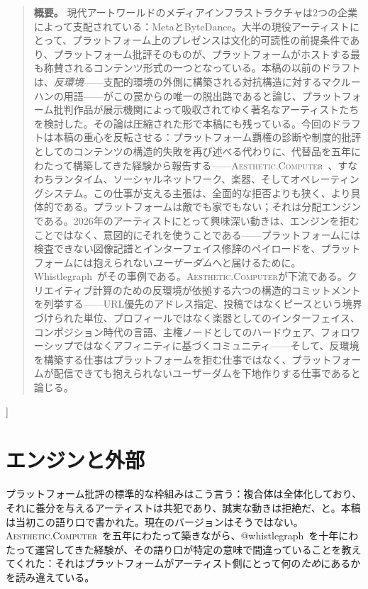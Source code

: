 \documentclass[10pt,letterpaper,twocolumn]{article}
\newcommand{\ac}{\textsc{Aesthetic.Computer}}
\begin{document}
{\begin{quote}
\small\noindent\textbf{概要。}
現代アートワールドのメディアインフラストラクチャは2つの企業によって支配されている：MetaとByteDance。大半の現役アーティストにとって、プラットフォーム上のプレゼンスは文化的可読性の前提条件であり、プラットフォーム批評そのものが、プラットフォームがホストする最も称賛されるコンテンツ形式の一つとなっている。本稿の以前のドラフトは、\emph{反環境}——支配的環境の外側に構築される対抗構造に対するマクルーハンの用語——がこの罠からの唯一の脱出路であると論じ、プラットフォーム批判作品が展示機関によって吸収されてゆく著名なアーティストたちを検討した。その論は圧縮された形で本稿にも残っている。今回のドラフトは本稿の重心を反転させる：プラットフォーム覇権の診断や制度的批評としてのコンテンツの構造的失敗を再び述べる代わりに、代替品を五年にわたって構築してきた経験から報告する——\ac{}~\citep{scudder2026ac}、すなわちランタイム、ソーシャルネットワーク、楽器、そしてオペレーティングシステム。この仕事が支える主張は、全面的な拒否よりも狭く、より具体的である。プラットフォームは敵でも家でもない；それは分配エンジンである。2026年のアーティストにとって興味深い動きは、エンジンを拒むことではなく、意図的にそれを使うことである——プラットフォームには検査できない図像記譜とインターフェイス修辞のペイロードを、プラットフォームには抱えられない\emph{ユーザーダム}へと届けるために。Whistlegraph~\citep{scudder2026whistlegraph}がその事例である。\ac{}が下流である。クリエイティブ計算のための反環境が依拠する六つの構造的コミットメントを列挙する——URL優先のアドレス指定、投稿ではなくピースという境界づけられた単位、プロフィールではなく楽器としてのインターフェイス、コンポジション時代の言語、主権ノードとしてのハードウェア、フォロワーシップではなくアフィニティに基づくコミュニティ——そして、反環境を構築する仕事はプラットフォームを拒む仕事ではなく、プラットフォームが配信できても抱えられないユーザーダムを下地作りする仕事であると論じる。
\end{quote}
\vspace{0.5em}
}]

\section{エンジンと外部}

プラットフォーム批評の標準的な枠組みはこう言う：複合体は全体化しており、それに養分を与えるアーティストは共犯であり、誠実な動きは拒絶だ、と。本稿は当初この語り口で書かれた。現在のバージョンはそうではない。\ac{}~\citep{scudder2026ac}を五年にわたって築きながら、@whistlegraph~\citep{scudder2026whistlegraph}を十年にわたって運営してきた経験が、その語り口が特定の意味で間違っていることを教えてくれた：それはプラットフォームがアーティスト側にとって何の\emph{ため}にあるかを読み違えている。
\end{document}
